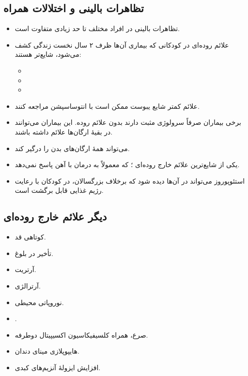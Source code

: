\documentclass[12pt,a4paper]{article}
\begin{document}
\subsection*{تظاهرات بالینی و اختلالات همراه}
\begin{itemize}
\item تظاهرات بالینی در افراد مختلف تا حد زیادی متفاوت است.
\item علائم روده‌ای در کودکانی که بیماری آن‌ها ظرف ۲ سال نخست زندگی کشف می‌شود، شایع‌تر هستند:
  \begin{itemize}
  \item {}
  \item {}
  \item {}
  \end{itemize}
\item علائم کمتر شایع \CeliacArrow{} یبوست \CeliacArrow{} ممکن است با انتوساسپشن مراجعه کنند.
\item برخی بیماران صرفاً سرولوژی مثبت دارند بدون علائم روده. این بیماران می‌توانند در بقیهٔ ارگان‌ها علائم داشته باشند.
\item {} می‌تواند همهٔ ارگان‌های بدن را درگیر کند.
\end{itemize}

\begin{itemize}
\item یکی از شایع‌ترین علائم خارج روده‌ای \CeliacArrow{} ؛ که معمولاً به درمان با آهن پاسخ نمی‌دهد.
\item استئوپوروز می‌تواند در آن‌ها دیده شود که برخلاف بزرگسالان، در کودکان با رعایت رژیم غذایی قابل برگشت است.
\end{itemize}

\subsection*{دیگر علائم خارج روده‌ای }
\begin{itemize}
\item کوتاهی قد.
\item تأخیر در بلوغ.
\item آرتریت.
\item آرترالژی.
\item نوروپاتی محیطی.
\item {}.
\item صرع، همراه کلسیفیکاسیون اکسیپیتال دوطرفه.
\item هایپوپلازی مینای دندان.
\item افزایش ایزولهٔ آنزیم‌های کبدی.
\end{itemize}
\end{document}
